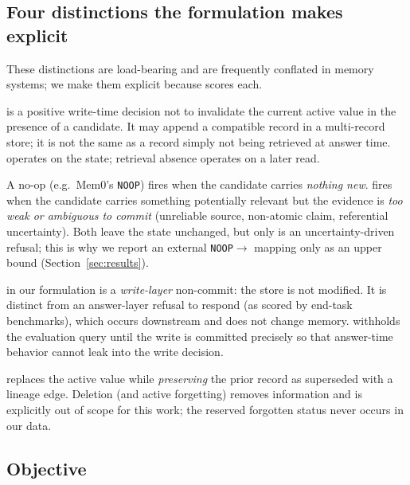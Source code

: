 \subsection{Four distinctions the formulation makes explicit}
\label{sec:distinctions}

These distinctions are load-bearing and are frequently conflated in memory
systems; we make them explicit because \mgp{} scores each.

\begin{description}[leftmargin=0em,topsep=2pt,itemsep=2pt]
\item[\keep{} vs.\ retrieval absence.] \keep{} is a positive write-time decision
not to invalidate the current active value in the presence of a candidate. It
may append a compatible record in a multi-record store; it is not the same as a
record simply not being retrieved at answer time. \keep{} operates on the
state; retrieval absence operates on a later read.
\item[\abstain{} vs.\ no-op.] A no-op (e.g.\ Mem0's \texttt{NOOP}) fires when the
candidate carries \emph{nothing new}. \abstain{} fires when the candidate carries
something potentially relevant but the evidence is \emph{too weak or ambiguous to
commit} (unreliable source, non-atomic claim, referential uncertainty). Both
leave the state unchanged, but only \abstain{} is an uncertainty-driven refusal;
this is why we report an external \texttt{NOOP}$\to$\abstain{} mapping only as an
upper bound (Section~\ref{sec:results}).
\item[Write-time vs.\ answer-time abstention.] \abstain{} in our formulation is a
\emph{write-layer} non-commit: the store is not modified. It is distinct from an
answer-layer refusal to respond (as scored by end-task benchmarks), which occurs
downstream and does not change memory. \mgp{} withholds the evaluation query
until the write is committed precisely so that answer-time behavior cannot leak
into the write decision.
\item[Supersession vs.\ deletion.] \supersede{} replaces the active value while
\emph{preserving} the prior record as \textsf{superseded} with a lineage edge.
Deletion (and active forgetting) removes information and is explicitly out of
scope for this work; the reserved \textsf{forgotten} status never occurs in our
data.
\end{description}

\subsection{Objective}

